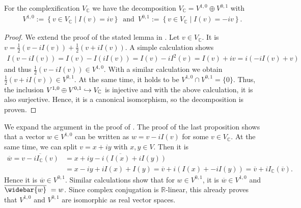 \begin{prop}
	\label{loc-theory:lm:decomposition-of-vc}
	For the complexification $V_\mathbb{C}$ we have the decomposition 
	$V_\mathbb{C} = V^{1,0} \oplus V^{0,1}$ with 
	\begin{align*}
		V^{1,0} := \left\{v \in V_\mathbb{C} \mid I(v) = iv\right\} \enspace
		\text{and} \enspace V^{0,1} := \left\{v \in V_\mathbb{C} \mid I(v) =- iv\right\}.
	\end{align*}
\end{prop}
\begin{proof}We extend the proof of the stated lemma in \cite{Huybrechts2004}.
	Let $v \in V_\mathbb{C}$. It is $v = \frac{1}{2} (v- iI(v)) + \frac{1}{2} (v + iI(v))$. A simple
	calculation shows
	\begin{align*}
		I(v-iI(v)) = I(v) -I(iI(v)) = I(v) - iI^2(v) = I(v) + iv = i(-iI(v) + v)
	\end{align*}
	and thus $\frac{1}{2} (v -iI(v)) \in V^{1,0}$. With a similar calculation we obtain 
	$\frac{1}{2} (v+iI(v)) \in V^{0,1}$. At the same time, it holds to be $V^{1,0} \cap V^{0,1} = \{0\}$. 
	Thus, the inclusion $V^{1,0} \oplus V^{0,1} \hookrightarrow V_\mathbb{C}$ is injective and with the above
	calculation, it is also surjective. Hence, it is a canonical isomorphism, so the decomposition is
	proven.
\end{proof}
\begin{rem} We expand the argument in the proof of \cite[Lemma 1.2.5]{Huybrechts2004}.
	The proof of the last proposition shows that a vector $w \in V^{1,0}$ can be written as 
	$w = v-iI(v)$ for some $v \in V_\mathbb{C}$. At the same time, we can split $v = x + iy$ 
	with $x,y \in V$. Then it is 
	\begin{align*}
		\overline{w} = \overline{v -iI_\mathbb{C}(v)} &= \overline{x + iy - i (I(x) + iI(y))}\\
		&= x -iy+iI(x)+I(y) = \overline{v}+ i(I(x) + -iI(y)) = \overline{v} + iI_\mathbb{C}(\overline{v}).
	\end{align*}
	Hence it is $\overline{w} \in V^{0,1}$. Similar calculations show that for $w \in V^{0,1}$, it is
	$\overline{w} \in V^{1,0}$ and $\overline{\widebar{w}} = w$. Since complex conjugation is
	$\mathbb{R}$-linear, this already proves that $V^{1,0}$ and $V^{0,1}$ are isomorphic as real vector
	spaces.
\end{rem}
